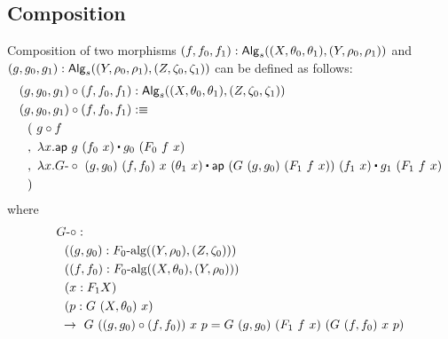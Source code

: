 \documentclass[a4paper,10pt]{report}
\begin{document}
\subsection{Composition}

Composition of two morphisms
$(f,f_0,f_1) : \mathsf{Alg}_s((X,\theta_0,\theta_1),(Y,\rho_0,\rho_1))$ and
$(g,g_0,g_1) : \mathsf{Alg}_s((Y,\rho_0,\rho_1),(Z,\zeta_0,\zeta_1))$ can be
defined as follows:
%
\begin{align*}
&(g,g_0,g_1) \circ (f,f_0,f_1) : \Alg_s((X,\theta_0,\theta_1),(Z,\zeta_0,\zeta_1)) \\
&(g,g_0,g_1) \circ (f,f_0,f_1) \ddefeq \\
&\ \ (\ g \circ f \\
&\ \ ,\ \lambda x . \ap\ g\ (f_0\ x) \ct g_0\ (F_0\ f\ x) \\
&\ \ ,\ \lambda x . \Gcomp\ (g,g_0)\ (f,f_0)\ x\ (\theta_1\ x) \ct \ap\ (G\ (g,g_0)\ (F_1\ f\ x))\ (f_1\ x) \ct g_1\ (F_1\ f\ x) \\
&\ \ )
\end{align*}
%
where
%
\begin{align*}
&\Gcomp : \\ 
&\ \ ((g,g_0) : \algcat{F_0}((Y,\rho_0),(Z,\zeta_0))) \\
&\ \ ((f,f_0) : \algcat{F_0}((X,\theta_0),(Y,\rho_0))) \\
&\ \ (x : F_1 X) \\
&\ \ (p : G\ (X,\theta_0)\ x) \\
&\ \to\ G\ ((g,g_0) \circ (f,f_0))\ x\ p = G\ (g,g_0)\ (F_1\ f\ x)\ (G\ (f,f_0)\ x\ p)
\end{align*}
%
\end{document}
